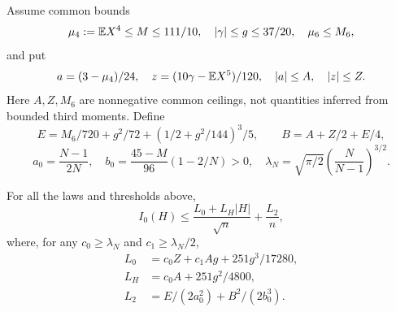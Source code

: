 Assume common bounds
\[
 \mu_4:=\mathbb E X^4\le M\le111/10,\quad |\gamma|\le g\le37/20,
 \quad\mu_6\le M_6,
\]
and put
\[
 a=(3-\mu_4)/24,\quad z=(10\gamma-\mathbb E X^5)/120,
 \quad |a|\le A,\quad |z|\le Z.
\]
Here $A,Z,M_6$ are nonnegative common ceilings, not quantities inferred
from bounded third moments. Define
\[
 E=M_6/720+g^2/72+(1/2+g^2/144)^3/5,\qquad
 B=A+Z/2+E/4,
\]
\[
 a_0=\frac{N-1}{2N},\quad b_0=\frac{45-M}{96}(1-2/N)>0,
 \quad\lambda_N=\sqrt{\pi/2}\left(\frac N{N-1}\right)^{3/2}.
\]
\begin{proposition}\label{v7fourier:low}
For all the laws and thresholds above,
\[
 I_0(H)\le\frac{L_0+L_H|H|}{\sqrt n}+\frac{L_2}{n},
\]
where, for any $c_0\ge\lambda_N$ and $c_1\ge\lambda_N/2$,
\begin{align*}
 L_0&=c_0Z+c_1Ag+251g^3/17280,\\
 L_H&=c_0A+251g^2/4800,\\
 L_2&=E/(2a_0^2)+B^2/(2b_0^3).
\end{align*}
\end{proposition}
